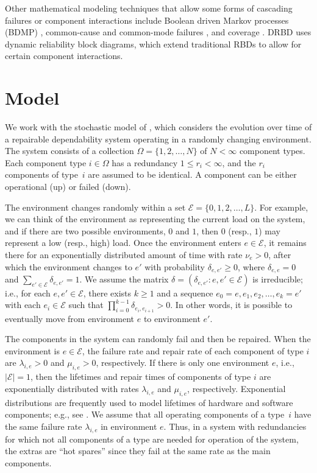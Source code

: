 \documentclass[12pt]{article}
\begin{document}
Other mathematical modeling techniques
that allow some forms of cascading
failures or component interactions
include Boolean driven
Markov processes (BDMP)
\cite{BoBo:2003},
common-cause and common-mode failures
\cite{ALRL:2004,BCS:1969},
and coverage
\cite{DuTr:1989}.
DRBD \cite{XXR:2009} uses
dynamic reliability block diagrams,
which extend traditional RBDs
to allow for certain component
interactions.

\section{Model}
\label{sec:model}

We work with the stochastic model of \cite{ING:2009}, which considers the
evolution over time of a repairable dependability system operating in a randomly
changing environment. The system consists of a collection $\Omega = \{ 1, 2,
\ldots, N \}$ of $N < \infty$ component types. Each component type $i \in
\Omega$ has a redundancy $1 \leq r_i < \infty$, and the $r_i$ components of
type~$i$ are assumed to be identical. A component can be either operational (up)
or failed (down).

The environment changes randomly within a set $\mathcal{E} = \{ 0, 1, 2, \ldots,
L \}$. For example, we can think of the environment as representing the current
load on the system, and if there are two possible environments, $0$ and $1$,
then $0$ (resp., $1$) may represent a low (resp., high) load. Once the
environment enters $e \in \mathcal{E}$, it remains there for an exponentially
distributed amount of time with rate $\nu_e > 0$, after which the environment
changes to $e'$ with probability $\delta_{e, e'} \geq 0$, where $\delta_{e, e} =
0$ and $\sum_{e' \in \mathcal{E}} \delta_{e, e'} = 1$. We assume the matrix
$\delta = (\delta_{e, e'} : e, e' \in \mathcal{E})$ is irreducible; i.e., for
each $e, e' \in \mathcal{E}$, there exists $k \geq 1$ and a sequence $e_0 = e,
e_1, e_2, \ldots, e_k = e'$ with each $e_i \in \mathcal{E}$ such that $\prod_{i
= 0}^{k-1} \delta_{e_i, e_{i + 1}} > 0$. In other words, it is possible to
eventually move from environment $e$ to environment $e'$.

The components in the system can randomly fail and then be repaired. When the
environment is $e \in \mathcal{E}$, the failure rate and repair rate of each
component of type $i$ are $\lambda_{i, e} > 0$ and $\mu_{i, e} > 0$,
respectively.  If there is only one environment $e$, i.e., $| \mathcal{E} | =
1$, then the lifetimes and repair times of components of type $i$ are
exponentially distributed with rates $\lambda_{i, e}$ and $\mu_{i, e}$,
respectively. Exponential distributions are frequently used to model lifetimes
of hardware and software components; e.g., see \cite{XDP:2004}. We assume that
all operating components of a type~$i$ have the same failure rate $\lambda_{i,
e}$ in environment $e$. Thus, in a system with  redundancies for which not all
components of a type are needed for operation of the system, the extras are
``hot spares'' since they fail at the same rate as the main components.
\end{document}
